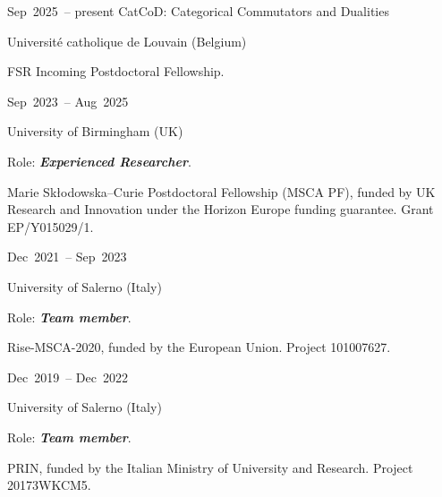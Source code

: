 
\chronorow
  {Sep~2025~--\allowbreak{} present}
  {CatCoD: Categorical Commutators and Dualities}
  {\textcolor{secondary}{Université catholique de Louvain (Belgium)}\par
   FSR Incoming Postdoctoral Fellowship.}

\chronorow
  {Sep~2023~--\allowbreak{} Aug~2025}
  {}
  {\textcolor{secondary}{University of Birmingham (UK)}\par
   Role: \textbf{\emph{Experienced Researcher}}.\par
   \gray  Marie Sk{\l}odowska--Curie Postdoctoral Fellowship (MSCA PF), funded by UK Research and Innovation
   under the Horizon Europe funding guarantee. Grant EP/Y015029/1.}

\chronorow
  {Dec~2021~--\allowbreak{} Sep~2023}
  {}
  {\textcolor{secondary}{University of Salerno (Italy)}\par
   Role: \textbf{\emph{Team member}}.\par
   \gray  Rise-MSCA-2020, funded by the European Union. Project 101007627.}

\chronorow
  {Dec~2019~--\allowbreak{} Dec~2022}
  {}
  {\textcolor{secondary}{University of Salerno (Italy)}\par
   Role: \textbf{\emph{Team member}}.\par
   \gray PRIN, funded by the Italian Ministry of University and Research. Project 20173WKCM5.}
